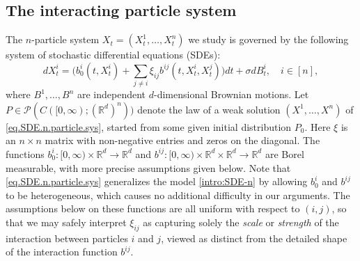 \documentclass[11pt,reqno]{amsart}
\numberwithin{equation}{section}
\theoremstyle{definition}
\def\P{{\mathcal P}}
\def\R{{\mathbb R}}
\begin{document}
\subsection{The interacting particle system}
The $n$-particle system $X_t=(X^1_t,\ldots,X^n_t)$ we study is governed by the following system of stochastic differential equations (SDEs):
\begin{equation}  \label{eq.SDE.n.particle.sys}
	d X^{i}_t = \Big(b_0^i(t, X^{i}_t) + \sum_{j \neq i} \xi_{ij} b^{ij}(t, X^{i}_t, X^{j}_t)\Big) dt + \sigma dB^i_t, \quad i \in [n],
\end{equation}
where $ B^1, \ldots, B^n $ are independent $ d $-dimensional Brownian motions. Let $ P \in \P( C([0,\infty);(\R^d)^n) )$ denote the law of a weak solution $ (X^1, \dots, X^n) $ of \eqref{eq.SDE.n.particle.sys}, started from some given initial distribution $P_0 $. 
Here $ \xi$ is an $n \times n$ matrix with non-negative entries and zeros on the diagonal.
The functions $b_0^i : [0, \infty) \times \R^d \to \R^d$ and $b^{ij}: [0, \infty) \times \R^d \times \R^d \to \R^d$ are Borel measurable, with more precise assumptions given below. 
Note that \eqref{eq.SDE.n.particle.sys} generalizes the model \eqref{intro:SDE-n} by allowing $b_0^i$ and $b^{ij}$ to be heterogeneous, which causes no additional difficulty in our arguments. The assumptions below on these functions are all uniform with respect to $(i,j)$, so that we may safely interpret $\xi_{ij}$ as capturing solely the \emph{scale} or \emph{strength} of the interaction between particles $i$ and $j$, viewed as distinct from the detailed shape of the interaction function $b^{ij}$.
\end{document}

